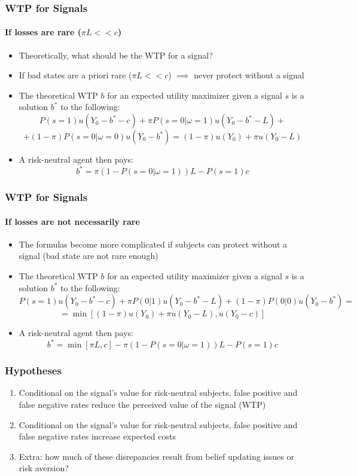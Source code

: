 \documentclass[11pt,hyperref={bookmarks=false}]{beamer}
\begin{document}
\begin{frame}
\frametitle{WTP for Signals}
\framesubtitle{If losses are rare ($\pi L<<c$)}

\begin{itemize}
	\item Theoretically, what should be the WTP for a signal?
	\item If bad states are a priori rare ($\pi L<<c$) $\implies$ never protect without a signal
	\item The theoretical WTP $b$ for an expected utility maximizer given a signal $s$ is a solution $b^*$ to the following:
	\small
		$$P(s=1)u(Y_0-b^*-c) + \pi P(s=0|\omega=1)u(Y_0-b^*-L)+$$
		$$+(1-\pi)P(s=0|\omega=0)u(Y_0-b^*) =(1-\pi)u(Y_0)+\pi u(Y_0-L)$$
\normalsize
	\item A risk-neutral agent then pays:
		\[b^*=\pi(1-P(s=0|\omega=1))L-P(s=1)c\]
\small
\end{itemize}
\end{frame}


\begin{frame}
\frametitle{WTP for Signals}
\framesubtitle{If losses are not necessarily rare}

\begin{itemize}
	\item The formulas become more complicated if subjects can protect without a signal (bad state are not rare enough)
	\item The theoretical WTP $b$ for an expected utility maximizer given a signal $s$ is a solution $b^*$ to the following:
	\small
 $$P(s=1)u(Y_0-b^*-c) + \pi P(0|1)u(Y_0-b^*-L)+(1-\pi)P(0|0)u(Y_0-b^*)=$$
		$$=\min[(1-\pi)u(Y_0)+\pi u(Y_0-L),u(Y_0-c)]$$

	\normalsize
	\item A risk-neutral agent then pays:
\small
		\[b^*=\min[\pi L,c]-\pi(1-P(s=0|\omega=1))L-P(s=1)c\]
\end{itemize}
\end{frame}



\begin{frame}
\frametitle{Hypotheses}
\begin{enumerate}
\item Conditional on the signal's value for risk-neutral subjects, false positive and false negative rates reduce the perceived value of the signal (WTP)
\item Conditional on the signal's value for risk-neutral subjects, false positive and false negative rates increase expected costs
\item Extra: how much of these disrepancies result from belief updating issues or risk aversion? 
\end{enumerate}
\end{frame}
\end{document}
